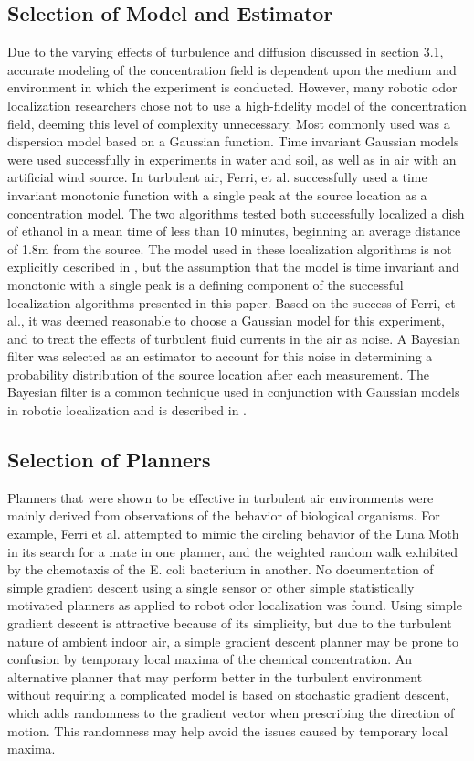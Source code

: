 \documentclass[submit, 12pt]{aiaa-pretty-modified}
\begin{document}
\subsection{Selection of Model and Estimator}
Due to the varying effects of turbulence and diffusion discussed in section 3.1,
accurate modeling of the concentration field is dependent upon the medium and
environment in which the experiment is conducted. However, many robotic odor
localization researchers chose not to use a high-fidelity model of the
concentration field, deeming this level of complexity unnecessary. \cite{kowadlo} Most
commonly used was a dispersion model based on a Gaussian function. Time
invariant Gaussian models were used successfully in experiments in water and
soil, as well as in air with an artificial wind source. \cite{kowadlo} In turbulent air,
Ferri, et al. successfully used a time invariant monotonic function with a
single peak at the source location as a concentration model. \cite{ferri} The two
algorithms tested both successfully localized a dish of ethanol in a mean time
of less than 10 minutes, beginning an average distance of 1.8m from the source.
The model used in these localization algorithms is not explicitly described in
\cite{ferri}, but the assumption that the model is time invariant and monotonic with a
single peak is a defining component of the successful localization algorithms
presented in this paper. Based on the success of Ferri, et al., it was
deemed reasonable to choose a Gaussian model for this
experiment, and to treat
the effects of turbulent fluid currents in the air as noise. A Bayesian filter
was selected as an estimator to account for this noise in determining a
probability distribution of the source 
location after each measurement. The
Bayesian filter is a common technique used in conjunction with Gaussian models
in robotic localization and is described in \cite{bergman}.

\subsection{Selection of Planners}
Planners that were shown to be effective in turbulent air environments were
mainly derived from observations of the behavior of biological organisms.
\cite{ferri} For example, Ferri et al. attempted to mimic the circling behavior
of the Luna Moth in its search for a mate in one planner, and the weighted
random walk exhibited by the chemotaxis of the E. coli bacterium in another.
\cite{ferri} No documentation of simple gradient descent using a single sensor
or other simple statistically motivated planners as applied to robot odor
localization was found. Using simple gradient descent is attractive because of
its simplicity, but due to the turbulent nature of ambient indoor air, a simple
gradient descent planner may be prone to confusion by temporary local maxima of
the chemical concentration. An alternative planner that may perform better in
the turbulent environment without requiring a complicated model is based on
stochastic gradient descent, which adds randomness to the gradient vector when
prescribing the direction of motion. \cite{bottou} This randomness may
help avoid
the issues caused by temporary local maxima.
\end{document}
